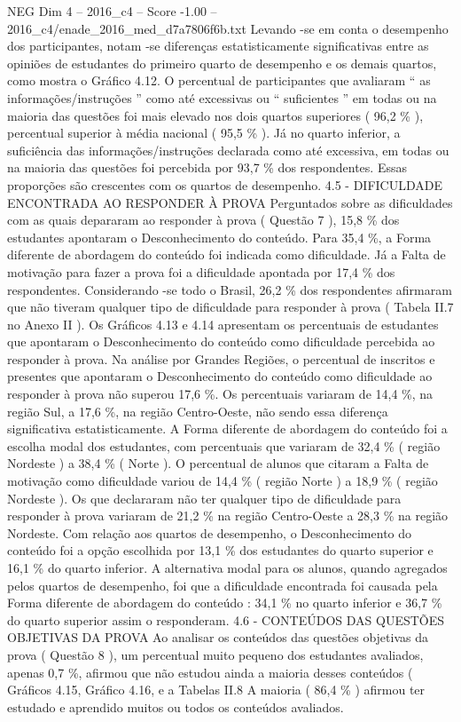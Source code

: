 \begin{textsample}{NEG Dim 4 – 2016\_c4 – Score -1.00 – 2016\_c4/enade\_2016\_med\_d7a7806f6b.txt}
Levando -se em conta o desempenho dos participantes, notam -se diferenças estatisticamente significativas entre as opiniões de estudantes do primeiro quarto de desempenho e os demais quartos, como mostra o Gráfico 4.12.
O percentual de participantes que avaliaram “ as informações/instruções ” como até excessivas ou “ suficientes ” em todas ou na maioria das questões foi mais elevado nos dois quartos superiores ( 96,2 \% ), percentual superior à média nacional ( 95,5 \% ).
Já no quarto inferior, a suficiência das informações/instruções declarada como até excessiva, em todas ou na maioria das questões foi percebida por 93,7 \% dos respondentes.
Essas proporções são crescentes com os quartos de desempenho. 4.5 - DIFICULDADE ENCONTRADA AO RESPONDER À PROVA Perguntados sobre as dificuldades com as quais depararam ao responder à prova ( Questão 7 ), 15,8 \% dos estudantes apontaram o Desconhecimento do conteúdo.
Para 35,4 \%, a Forma diferente de abordagem do conteúdo foi indicada como dificuldade.
Já a Falta de motivação para fazer a prova foi a dificuldade apontada por 17,4 \% dos respondentes.
Considerando -se todo o Brasil, 26,2 \% dos respondentes afirmaram que não tiveram qualquer tipo de dificuldade para responder à prova ( Tabela II.7 no Anexo II ).
Os Gráficos 4.13 e 4.14 apresentam os percentuais de estudantes que apontaram o Desconhecimento do conteúdo como dificuldade percebida ao responder à prova.
Na análise por Grandes Regiões, o percentual de inscritos e presentes que apontaram o Desconhecimento do conteúdo como dificuldade ao responder à prova não superou 17,6 \%.
Os percentuais variaram de 14,4 \%, na região Sul, a 17,6 \%, na região Centro-Oeste, não sendo essa diferença significativa estatisticamente.
A Forma diferente de abordagem do conteúdo foi a escolha modal dos estudantes, com percentuais que variaram de 32,4 \% ( região Nordeste ) a 38,4 \% ( Norte ).
O percentual de alunos que citaram a Falta de motivação como dificuldade variou de 14,4 \% ( região Norte ) a 18,9 \% ( região Nordeste ).
Os que declararam não ter qualquer tipo de dificuldade para responder à prova variaram de 21,2 \% na região Centro-Oeste a 28,3 \% na região Nordeste.
Com relação aos quartos de desempenho, o Desconhecimento do conteúdo foi a opção escolhida por 13,1 \% dos estudantes do quarto superior e 16,1 \% do quarto inferior.
A alternativa modal para os alunos, quando agregados pelos quartos de desempenho, foi que a dificuldade encontrada foi causada pela Forma diferente de abordagem do conteúdo : 34,1 \% no quarto inferior e 36,7 \% do quarto superior assim o responderam. 4.6 - CONTEÚDOS DAS QUESTÕES OBJETIVAS DA PROVA Ao analisar os conteúdos das questões objetivas da prova ( Questão 8 ), um percentual muito pequeno dos estudantes avaliados, apenas 0,7 \%, afirmou que não estudou ainda a maioria desses conteúdos ( Gráficos 4.15, Gráfico 4.16, e a Tabelas II.8 A maioria ( 86,4 \% ) afirmou ter estudado e aprendido muitos ou todos os conteúdos avaliados.

\end{textsample}
